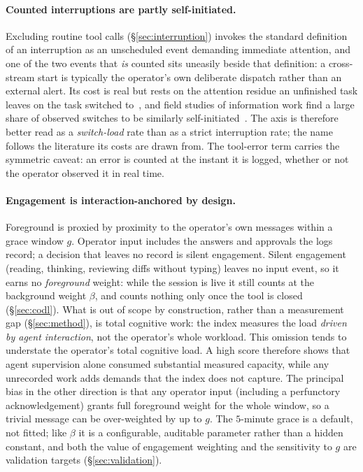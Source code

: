 \documentclass[10pt,twocolumn]{article}
\begin{document}
\paragraph{Counted interruptions are partly self-initiated.} Excluding
routine tool calls (\S\ref{sec:interruption}) invokes the standard definition
of an interruption as an unscheduled event demanding immediate attention, and
one of the two events that \emph{is} counted sits uneasily beside that
definition: a cross-stream start is typically the operator's own deliberate
dispatch rather than an external alert. Its cost is real but rests on the
attention residue an unfinished task leaves on the task switched
to~\cite{leroy2009}, and field studies of information work find a large share
of observed switches to be similarly self-initiated~\cite{mark2005}. The axis
is therefore better read as a \emph{switch-load} rate than as a strict
interruption rate; the name follows the literature its costs are drawn from.
The tool-error term carries the symmetric caveat: an error is counted at the
instant it is logged, whether or not the operator observed it in real time.

\paragraph{Engagement is interaction-anchored by design.} Foreground is proxied
by proximity to the operator's own messages within a grace window $g$. Operator
input includes the answers and approvals the logs record; a decision that leaves
no record is silent engagement. Silent
engagement (reading, thinking, reviewing diffs without typing) leaves no input
event, so it earns no \emph{foreground} weight: while the session is live it still
counts at the background weight $\beta$, and counts nothing only once the tool is
closed (\S\ref{sec:codl}). What is out of scope by construction, rather than a
measurement gap (\S\ref{sec:method}), is total cognitive work: the index measures
the load \emph{driven by agent interaction}, not the operator's whole workload.
This omission tends to understate the operator's total cognitive load. A high
score therefore shows that agent supervision alone consumed substantial measured
capacity, while any unrecorded work adds demands that the index does not capture.
The principal bias in the other direction is that any
operator input (including a perfunctory acknowledgement) grants full
foreground weight for the whole window, so a trivial message can be over-weighted
by up to $g$. The $5$-minute grace is a default, not fitted; like $\beta$ it is a
configurable, auditable parameter rather than a hidden constant, and both the
value of engagement weighting and the sensitivity to $g$ are validation targets
(\S\ref{sec:validation}).
\end{document}
